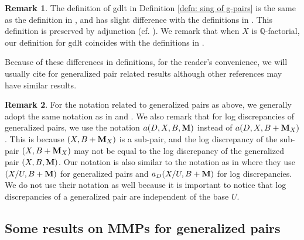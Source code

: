 \documentclass[11pt]{amsart}
\numberwithin{equation}{section}
\newcommand{\Mm}{{\bf{M}}}
\newcommand{\Qq}{\mathbb{Q}}
\newtheorem{thm}{Theorem}[section]
\theoremstyle{definition}
\theoremstyle{definition}
\newtheorem{rem}[thm]{Remark}
\theoremstyle{definition}
\begin{document}
\begin{rem}\label{rem: difference in definition of gdlt}
The definition of gdlt in Definition \ref{defn: sing of g-pairs} is the same as the definition in \cite[Definition 2.2]{HL18}, and has slight difference with the definitions in \cite{Bir19,Fil18b,FS20b}. This definition is preserved by adjunction (cf. \cite[Proposition 2.8]{HL18}). We remark that when $X$ is $\Qq$-factorial, our definition for gdlt coincides with the definitions in \cite{Bir19,Fil18b,FS20b}. 
 
 Because of these differences in definitions, for the reader's convenience, we will usually cite \cite{HL18} for generalized pair related results although other references may have similar results.
\end{rem}

\begin{rem}\label{rem: difference in notation of g-pair}
For the notation related to generalized pairs as above, we generally adopt the same notation as in \cite{FS20b} and \cite{Has20}.  We also remark that for log discrepancies of generalized pairs, we use the notation $a(D,X,B,\Mm)$ instead of $a(D,X,B+\Mm_X)$. This is because $(X,B+\Mm_X)$ is a sub-pair, and the log discrepancy of the sub-pair $(X,B+\Mm_X)$ may not be equal to the log discrepancy of the generalized pair $(X,B,\Mm)$. Our notation is also similar to the notation as in \cite{HL19,HL20d} where they use $(X/U,B+\Mm)$ for generalized pairs and $a_D(X/U,B+\Mm)$ for log discrepancies. We do not use their notation as well because it is important to notice that log discrepancies of a generalized pair are independent of the base $U$.
\end{rem}








\subsection{Some results on MMPs for generalized pairs}

\begin{comment}
\begin{thm}[Length of extremal rays, {\cite[Proposition 3.13]{HL18}}]\label{thm: length of extremal ray g-pair}
Let $(X,B,\Mm)/U$ be a $\Qq$-factorial glc g-pair such that $X$ is klt, and $R$ a $(K_X+B+\Mm_X)$-negative extremal ray over $U$. Then there exists a curve $C\subset X$ such that $[C]\in R$ and 
$$0<-(K_X+B+\Mm_X)\cdot C\leq 2\dim X.$$
\end{thm}
\end{comment}
\end{document}
